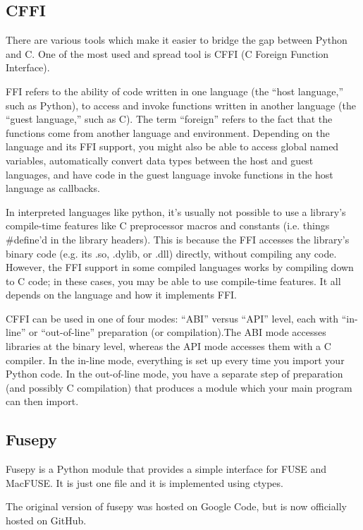     \subsection{CFFI}
        There are various tools which make it easier to bridge the gap between Python and C. One of the most used and spread tool is CFFI (C Foreign Function Interface).
        
        FFI refers to the ability of code written in one language (the “host language,” such as Python), to access and invoke functions written in another language (the “guest language,” such as C). The term “foreign” refers to the fact that the functions come from another language and environment.
        Depending on the language and its FFI support, you might also be able to access global named variables, automatically convert data types between the host and guest languages, and have code in the guest language invoke functions in the host language as callbacks.
        
        In interpreted languages like python, it’s usually not possible to use a library’s compile-time features like C preprocessor macros and constants (i.e. things \#define’d in the library headers). This is because the FFI accesses the library’s binary code (e.g. its .so, .dylib, or .dll) directly, without compiling any code.
        However, the FFI support in some compiled languages works by compiling down to C code; in these cases, you may be able to use compile-time features. It all depends on the language and how it implements FFI.
        
        CFFI can be used in one of four modes: “ABI” versus “API” level, each with “in-line” or “out-of-line” preparation (or compilation).The ABI mode accesses libraries at the binary level, whereas the API mode accesses them with a C compiler.
        In the in-line mode, everything is set up every time you import your Python code. In the out-of-line mode, you have a separate step of preparation (and possibly C compilation) that produces a module which your main program can then import.
    \subsection{Fusepy}
        Fusepy is a Python module that provides a simple interface for FUSE and MacFUSE. It is just one file and it is implemented using ctypes.

        The original version of fusepy was hosted on Google Code, but is now officially hosted on GitHub.
       
